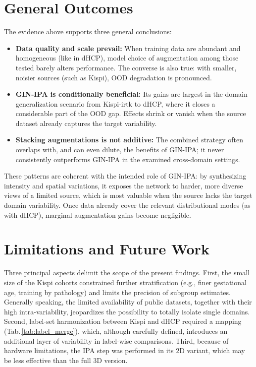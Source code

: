 \section{General Outcomes}
The evidence above supports three general conclusions:
\begin{itemize}
    \item \textbf{Data quality and scale prevail:} When training data are abundant and homogeneous (like in dHCP), model choice of augmentation among those tested barely alters performance. The converse is also true: with smaller, noisier sources (such as Kispi), OOD degradation is pronounced.
    \item \textbf{GIN-IPA is conditionally beneficial:} Its gains are largest in the domain generalization scenario from Kispi-irtk to dHCP, where it closes a considerable part of the OOD gap. Effects shrink or vanish when the source dataset already captures the target variability.
    \item \textbf{Stacking augmentations is not additive:} The combined strategy often overlaps with, and can even dilute, the benefits of GIN-IPA; it never consistently outperforms GIN-IPA in the examined cross-domain settings.
\end{itemize}

These patterns are coherent with the intended role of GIN-IPA: by synthesizing intensity and spatial variations, it exposes the network to harder, more diverse views of a limited source, which is most valuable when the source lacks the target domain variability. Once data already cover the relevant distributional modes (as with dHCP), marginal augmentation gains become negligible.

\section{Limitations and Future Work}
Three principal aspects delimit the scope of the present findings. First, the small size of the Kispi cohorts constrained further stratification (e.g., finer gestational age, training by pathology) and limits the precision of subgroup estimates. Generally speaking, the limited availability of public datasets, together with their high intra-variability, jeopardizes the possibility to totally isolate single domains. Second, label-set harmonization between Kispi and dHCP required a mapping (Tab.\,\ref{tab:label_merge}), which, although carefully defined, introduces an additional layer of variability in label-wise comparisons. Third, because of hardware limitations, the IPA step was performed in its 2D variant, which may be less effective than the full 3D version.

